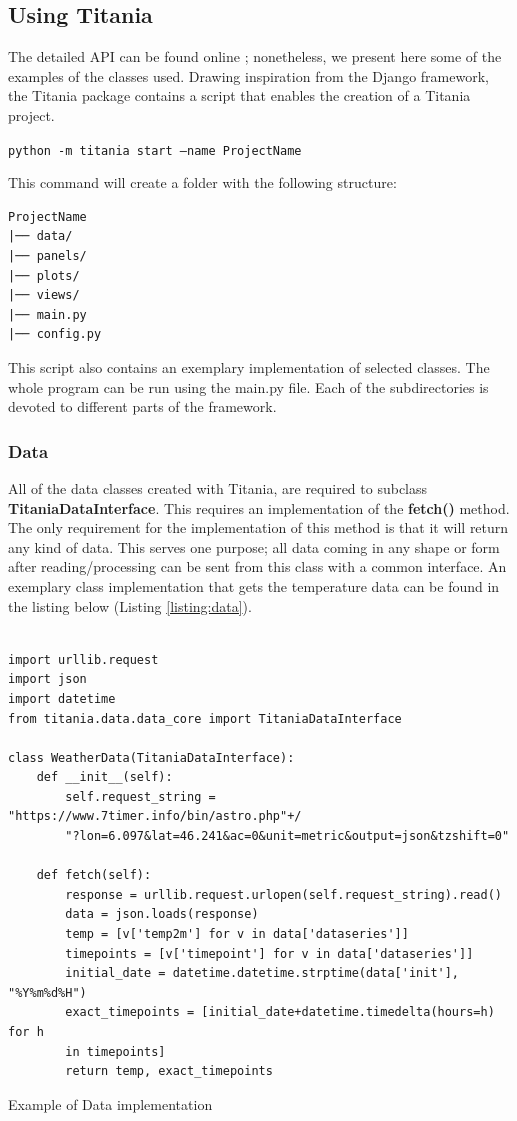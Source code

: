 \subsection{Using Titania}

The detailed API can be found online \cite{titaniadoc}; nonetheless, we present here some of the examples of the classes used.
Drawing inspiration from the Django framework, the Titania package contains a script that enables the creation of a Titania project.

\texttt{python -m titania start --name ProjectName}

This command will create a folder with the following structure:

\begin{listing}[!ht]
\begin{verbatim}
ProjectName
|── data/
|── panels/
|── plots/
|── views/
|── main.py
|── config.py
\end{verbatim}
\end{listing}

This script also contains an exemplary implementation of selected classes.
The whole program can be run using the main.py file.
Each of the subdirectories is devoted to different parts of the framework.


\subsubsection{Data}
\label{sec:titania_data}

All of the data classes created with Titania, are required to subclass \textbf{TitaniaDataInterface}. This requires an implementation of the \textbf{fetch()} method.
The only requirement for the implementation of this method is that it will return any kind of data.
This serves one purpose; all data coming in any shape or form after reading/processing can be sent from this class with a common interface. An exemplary class implementation that gets the temperature data can be found in the listing below (Listing \ref{listing:data}).

\begin{listing}[!ht]
\begin{verbatim}

import urllib.request
import json
import datetime
from titania.data.data_core import TitaniaDataInterface

class WeatherData(TitaniaDataInterface):
    def __init__(self):
        self.request_string = "https://www.7timer.info/bin/astro.php"+/
        "?lon=6.097&lat=46.241&ac=0&unit=metric&output=json&tzshift=0"

    def fetch(self):
        response = urllib.request.urlopen(self.request_string).read()
        data = json.loads(response)
        temp = [v['temp2m'] for v in data['dataseries']]
        timepoints = [v['timepoint'] for v in data['dataseries']]
        initial_date = datetime.datetime.strptime(data['init'], "%Y%m%d%H")
        exact_timepoints = [initial_date+datetime.timedelta(hours=h) for h
        in timepoints]
        return temp, exact_timepoints
\end{verbatim}
\caption{Example of Data implementation}
\label{listing:data}
\end{listing}


